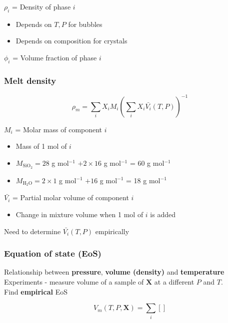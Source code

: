 \documentclass{beamer}
\begin{document}
\begin{frame}
  \vspace{0.25cm}
  
  $\rho_{i}$ = Density of phase $i$ \\
  \begin{itemize}
  \item Depends on $T, P$ for bubbles \\
  \item Depends on composition for crystals \\
  \end{itemize}

  \vspace{0.25cm}
  
  $\phi_{i}$ = Volume fraction of phase $i$ \\
    
  
\end{frame}

\begin{frame}
  \frametitle{Melt density}

  $$\rho_{m} = \sum_{i} X_{i} M_{i} \left(\sum_{i} X_{i} \bar{V_{i}}(T, P)\right)^{-1}$$

  $M_{i}$ = Molar mass of component $i$\\
  \begin{itemize}
  \item Mass of 1 mol of $i$ \\
  \item $M_{\text{SiO}_{2}} = 28$ g mol$^{-1}$ $+ 2 \times 16$ g mol$^{-1}$ = 60 g mol$^{-1}$\\
  \item $M_{\text{H}_{2}\text{O}} = 2 \times 1$ g mol$^{-1}$ $+ 16$ g mol$^{-1}$ = 18 g mol$^{-1}$\\
  \end{itemize}

  $\bar{V_{i}}$ = Partial molar volume of component $i$ \\
  \begin{itemize}
    \item Change in mixture volume when 1 mol of $i$ is added \\
  \end{itemize}

  Need to determine $\bar{V_{i}}(T, P)$ empirically \\
\end{frame}

\begin{frame}
  \frametitle{Equation of state (EoS)}

  Relationship between \textbf{pressure}, \textbf{volume (density)} and \textbf{temperature} \\

  Experiments - measure volume of a sample of $\mathbf{X}$ at a different $P$ and $T$. \\

  Find \textbf{empirical} EoS

  $$ V_{m}(T, P, \mathbf{X}) = \sum_{i} \left[ \right]$$
\end{frame}
\end{document}
